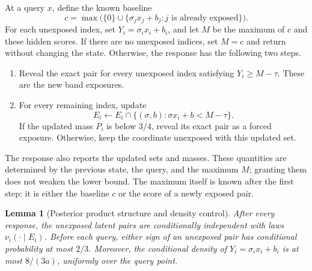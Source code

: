 \documentclass[11pt]{article}
\newtheorem{lemma}[lemma]{Lemma}
\theoremstyle{definition}
\theoremstyle{remark}
\begin{document}
At a query $x$, define the known baseline
\[
 c=\max\bigl(\{0\}\cup
       \{\sigma_jx_j+b_j:j\text{ is already exposed}\}\bigr).
\]
For each unexposed index, set $Y_i=\sigma_ix_i+b_i$, and let
$M$ be the maximum of $c$ and these hidden scores.  If there are no
unexposed indices, set $M=c$ and return without changing the state.
Otherwise, the response has the following two steps.
\begin{enumerate}
 \item Reveal the exact pair for every unexposed index satisfying
 $Y_i\ge M-\tau$.  These are the new band exposures.
 \item For every remaining index, update
 \begin{equation}
 \label{eq:E-update}
 E_i\leftarrow
 E_i\cap\{(\sigma,b):\sigma x_i+b<M-\tau\}.
 \end{equation}
 If the updated mass $P_i$ is below $3/4$, reveal its exact pair as a
 forced exposure.  Otherwise, keep the coordinate unexposed with this
 updated set.
\end{enumerate}
The response also reports the updated sets and masses.  These quantities
are determined by the previous state, the query, and the maximum $M$;
granting them does not weaken the lower bound.  The maximum itself is
known after the first step: it is either the baseline $c$ or the score
of a newly exposed pair.

\begin{lemma}[Posterior product structure and density control]
\label{lem:posterior}
After every response, the unexposed latent pairs are conditionally
independent with laws $\nu_i(\cdot\mid E_i)$.  Before each query, either
sign of an unexposed pair has conditional probability at most $2/3$.
Moreover, the conditional density of
$Y_i=\sigma_ix_i+b_i$ is at most $8/(3a)$, uniformly over the query point.
\end{lemma}
\end{document}
